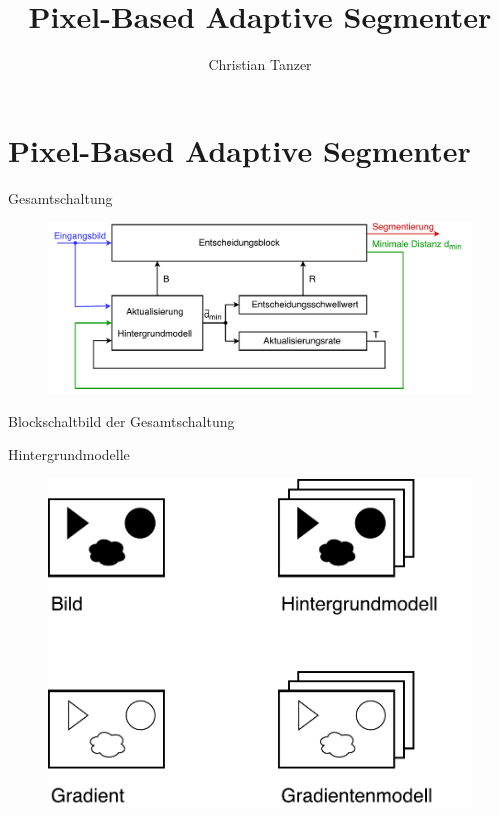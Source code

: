 \documentclass[hyperref={pdfpagelabels=false}]{beamer}
\begin{document}
\title{Pixel-Based Adaptive Segmenter}   
\author{Christian Tanzer} 
\date{}

\section{Pixel-Based Adaptive Segmenter}

\begin{frame}
	\maketitle
\end{frame}

\begin{frame}{Gesamtschaltung}
	\begin{figure}
		\centering
		\includegraphics[width=\linewidth]{./Bilder/PDF/PBAS_Blockdiagramm.pdf}
	\end{figure}
	\begin{center}
		Blockschaltbild der Gesamtschaltung
	\end{center}
\end{frame}

\begin{frame}{Hintergrundmodelle}
	\begin{figure}
		\centering
		\includegraphics[width=.8\linewidth]{./Bilder/PDF/arrays.pdf}
	\end{figure}	
\end{frame}
\end{document}
